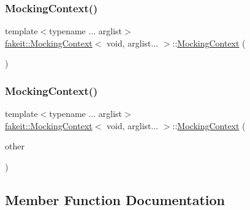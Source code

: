 \subsubsection{\texorpdfstring{MockingContext()}{MockingContext()}\hspace{0.1cm}{\footnotesize\ttfamily [26/27]}}
{\footnotesize\ttfamily template$<$typename ... arglist$>$ \\
\mbox{\hyperlink{classfakeit_1_1MockingContext}{fakeit\+::\+Mocking\+Context}}$<$ void, arglist... $>$\+::\mbox{\hyperlink{classfakeit_1_1MockingContext}{Mocking\+Context}} (\begin{DoxyParamCaption}\item[{\mbox{\hyperlink{classfakeit_1_1MockingContext}{Mocking\+Context}}$<$ void, arglist... $>$ \&}]{ }\end{DoxyParamCaption})\hspace{0.3cm}{\ttfamily [default]}}

\mbox{\label{classfakeit_1_1MockingContext_3_01void_00_01arglist_8_8_8_01_4_a1f7b3663809191b919290f0db05d59f1}} 
\subsubsection{\texorpdfstring{MockingContext()}{MockingContext()}\hspace{0.1cm}{\footnotesize\ttfamily [27/27]}}
{\footnotesize\ttfamily template$<$typename ... arglist$>$ \\
\mbox{\hyperlink{classfakeit_1_1MockingContext}{fakeit\+::\+Mocking\+Context}}$<$ void, arglist... $>$\+::\mbox{\hyperlink{classfakeit_1_1MockingContext}{Mocking\+Context}} (\begin{DoxyParamCaption}\item[{\mbox{\hyperlink{classfakeit_1_1MockingContext}{Mocking\+Context}}$<$ void, arglist... $>$ \&\&}]{other }\end{DoxyParamCaption})\hspace{0.3cm}{\ttfamily [inline]}}



\subsection{Member Function Documentation}
\mbox{\label{classfakeit_1_1MockingContext_3_01void_00_01arglist_8_8_8_01_4_a28152fc4e0105f5e6424515367a5d4c3}} 
